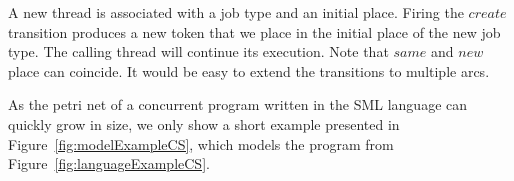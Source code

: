 
\noindent%
\begin{minipage}{0.59\linewidth}
  A new thread is associated with a job type and an initial
  place. Firing the $create$ transition produces a new token that we
  place in the initial place of the new job type. The calling thread
  will continue its execution. Note that $same$ and $new$ place can
  coincide. It would be easy to extend the transitions to multiple
  arcs.
\end{minipage}
\begin{minipage}{0.4\linewidth}
\hfill%
\end{minipage}%



As the petri net of a concurrent program written in the SML language
can quickly grow in size, we only show a short example presented in
Figure~\ref{fig:modelExampleCS}, which models the program from
Figure~\ref{fig:languageExampleCS}.

